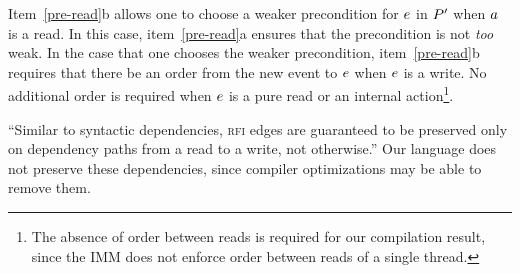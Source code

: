 \begin{definition}
\begin{enumerate}
\end{enumerate}
\end{definition}


Item~\ref{pre-read}b allows one to choose a weaker precondition for $e$ in
$P'$ when $a$ is a read.  In this case, item~\ref{pre-read}a ensures
that the precondition is not \emph{too} weak.  In the case that one chooses
the weaker precondition, item~\ref{pre-read}b requires that there be an order
from the new event to $e$ when $e$ is a write.  No additional order is
required when $e$ is a pure read or an internal action\footnote{The
  absence of order between reads is required for our compilation result,
  since the IMM does not enforce order between reads of a single thread.}.

``Similar to syntactic dependencies, \textsc{rfi} edges are guaranteed to be preserved
only on dependency paths from a read to a write, not otherwise.''
Our language does not preserve these dependencies, since compiler
optimizations may be able to remove them.



